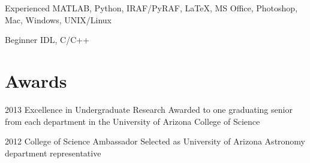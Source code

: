 \documentclass{tccv}
\begin{document}
\begin{factlist}

\item{Experienced}
     {MATLAB, Python, IRAF/PyRAF, \LaTeX, MS Office, Photoshop, Mac, Windows, UNIX/Linux}

\item{Beginner}
     {IDL, C/C++}

\end{factlist}

\section{Awards}

\begin{yearlist}

\item{2013}
	{Excellence in Undergraduate Research}
     {Awarded to one graduating senior from each department in the University of Arizona College of Science}

\item{2012}
     {College of Science Ambassador}
     {Selected as University of Arizona Astronomy department representative}

\end{yearlist}
\end{document}
